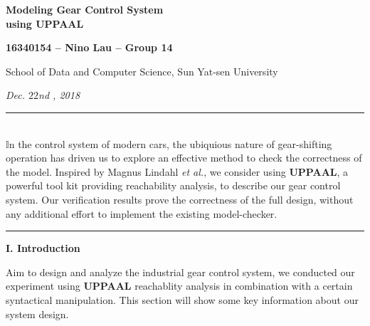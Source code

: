 \documentclass[a4paper]{article}
\newcommand{\HRule}{\rule{\linewidth}{0.5mm}}
\begin{document}
\begin{center}
\Huge\textbf{Modeling Gear Control System \\}
\vspace{1mm}
\Huge\textbf{using U\Large{PPAAL}\huge*}
\end{center}
\vspace{3mm}

\vspace{2mm}
\begin{center}
\large\textbf{16340154 -- Nino Lau -- Group 14}\\
\end{center}

\begin{center}
\small{School of Data and Computer Science, Sun Yat-sen University}
\end{center}

\begin{center}
\textit{Dec. $22$\small nd \textit, 2018\\}
\end{center}
\vspace{3mm}


\noindent \HRule
\vspace{2.5mm} \\
\large{
\Large{$\mathbb{I}$}\large n the control system of modern cars, the ubiquious nature of gear-shifting operation has driven us to explore an effective method to check the correctness of the model. Inspired by Magnus Lindahl \emph{et al.}, we consider using \textbf{U\small{PPAAL}\large*}, a powerful tool kit providing reachability analysis, to describe our gear control system. Our verification results prove the correctness of the full design, without any additional effort to implement the existing model-checker.}
\vspace{2mm} \\
\HRule

\vspace{6mm}
\begin{center}
\LARGE\textbf{I. Introduction} \\
\end{center}
\vspace{2mm}

\large{Aim to design and analyze the industrial gear control system, we conducted our experiment using \textbf{U\small{PPAAL}\large*} reachablity analysis in combination with a certain syntactical manipulation. This section will show some key information about our system design.}
\end{document}

